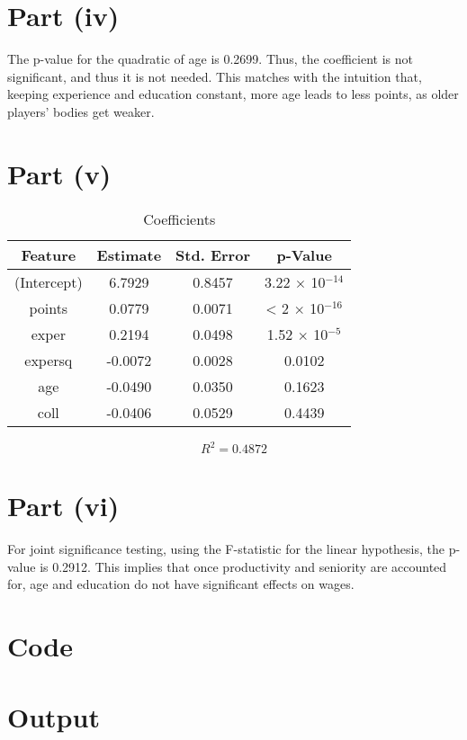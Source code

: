 \documentclass{./solution}
\begin{document}
\begin{solution}[Wooldridge C6.9]
        \section{Part (iv)}
            The p-value for the quadratic of age is 0.2699.
            Thus, the coefficient is not significant, and thus it is not needed.
            This matches with the intuition that, keeping experience and education constant, more age leads to less points, as older players' bodies get weaker.

        \section{Part (v)}
            \begin{table}[H]
                \caption{Coefficients}
                \begin{tabularx}{\textwidth}{C C C C}
                    \toprule
                    Feature & Estimate & Std. Error & p-Value \\
                    \midrule
                    (Intercept) &  6.7929 & 0.8457 & 3.22 $\times$ 10$^{-14}$ \\
                    points      &  0.0779 & 0.0071 &  < 2 $\times$ 10$^{-16}$ \\
                    exper       &  0.2194 & 0.0498 & 1.52 $\times$ 10$^{-5}$ \\
                    expersq     & -0.0072 & 0.0028 &   0.0102 \\
                    age         & -0.0490 & 0.0350 &   0.1623 \\
                    coll        & -0.0406 & 0.0529 &   0.4439 \\
                    \bottomrule
                \end{tabularx}
            \end{table}
            \vspace{-5mm}
            $$ R^2 = 0.4872 $$

        \section{Part (vi)}
            For joint significance testing, using the F-statistic for the linear hypothesis, the p-value is 0.2912.
            This implies that once productivity and seniority are accounted for, age and education do not have significant effects on wages.

        \section{Code}

        \section{Output}
    \end{solution}
\end{document}
